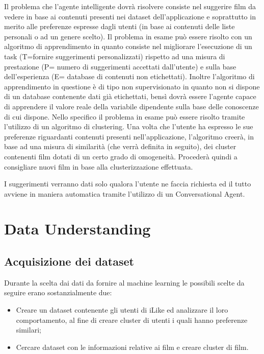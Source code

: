 \documentclass[a4paper, 12pt]{report}
\begin{document}
        Il problema che l'agente intelligente dovrà risolvere consiste nel suggerire film da vedere in base ai contenuti
        presenti nei dataset dell'applicazione e soprattutto in merito alle preferenze espresse dagli utenti (in base ai
        contenuti delle liste personali o ad un genere scelto).
        Il problema in esame può essere risolto con un algoritmo di apprendimento in quanto consiste nel migliorare l'esecuzione
        di un task (T=fornire suggerimenti personalizzati) rispetto ad una misura di prestazione (P= numero di suggerimenti accettati
        dall'utente) e sulla base dell'esperienza (E= database di contenuti non etichettati). Inoltre l'algoritmo di apprendimento
        in questione è di tipo non supervisionato in quanto non si dispone di un database contenente dati già etichettati, bensì dovrà
        essere l'agente capace di apprendere il valore reale della variabile dipendente sulla base delle conoscenze di cui dispone.
        Nello specifico il problema in esame può essere risolto tramite l'utilizzo di un algoritmo di clustering. Una volta che l'utente
        ha espresso le sue preferenze riguardanti contenuti presenti nell'applicazione, l'algoritmo creerà, in base ad una misura di similarità
        (che verrà definita in seguito), dei cluster contenenti film dotati di un certo grado di omogeneità. Procederà quindi a consigliare nuovi
        film in base alla clusterizzazione effettuata.

        I suggerimenti verranno dati solo qualora l'utente ne faccia richiesta ed il tutto avviene in maniera automatica tramite l'utilizzo
        di un Conversational Agent.

    \chapter{Data Understanding}\label{ch:data-understanding}

        \section{Acquisizione dei dataset}\label{sec:acquisizione-dei-dataset}
            Durante la scelta dai dati da fornire al machine learning le possibili scelte da seguire erano sostanzialmente due:
            \begin{itemize}
                \item Creare un dataset contenente gli utenti di iLike ed analizzare il loro comportamento, al fine di creare
                      cluster di utenti i quali hanno preferenze similari;
                \item Cercare dataset con le informazioni relative ai film e creare cluster di film.
            \end{itemize}
\end{document}
